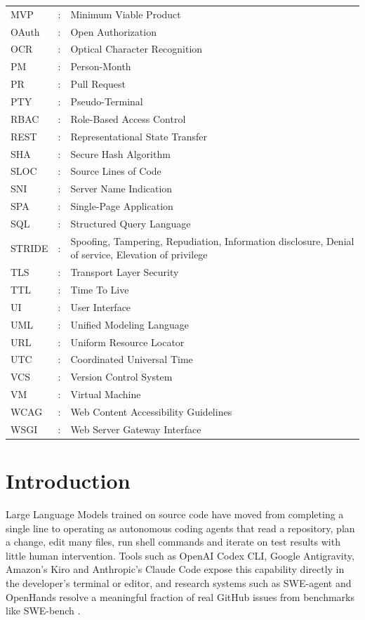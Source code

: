 \documentclass[12pt,a4paper,oneside]{report}
\begin{document}
\begin{longtable}{@{}p{1.1in}@{}p{0.25in}@{}p{4.9in}@{}}
MVP &: & Minimum Viable Product \\[2pt]
OAuth &: & Open Authorization \\[2pt]
OCR &: & Optical Character Recognition \\[2pt]
PM &: & Person-Month \\[2pt]
PR &: & Pull Request \\[2pt]
PTY &: & Pseudo-Terminal \\[2pt]
RBAC &: & Role-Based Access Control \\[2pt]
REST &: & Representational State Transfer \\[2pt]
SHA &: & Secure Hash Algorithm \\[2pt]
SLOC &: & Source Lines of Code \\[2pt]
SNI &: & Server Name Indication \\[2pt]
SPA &: & Single-Page Application \\[2pt]
SQL &: & Structured Query Language \\[2pt]
STRIDE &: & Spoofing, Tampering, Repudiation, Information disclosure, Denial of service, Elevation of privilege \\[2pt]
TLS &: & Transport Layer Security \\[2pt]
TTL &: & Time To Live \\[2pt]
UI &: & User Interface \\[2pt]
UML &: & Unified Modeling Language \\[2pt]
URL &: & Uniform Resource Locator \\[2pt]
UTC &: & Coordinated Universal Time \\[2pt]
VCS &: & Version Control System \\[2pt]
VM &: & Virtual Machine \\[2pt]
WCAG &: & Web Content Accessibility Guidelines \\[2pt]
WSGI &: & Web Server Gateway Interface \\[2pt]
\end{longtable}

\clearpage
{}
\setcounter{page}{1}

\chapter{Introduction}\label{introduction}

Large Language Models trained on source code have moved from completing a single line to operating as autonomous coding agents that read a repository, plan a change, edit many files, run shell commands and iterate on test results with little human intervention. Tools such as OpenAI Codex CLI, Google Antigravity, Amazon's Kiro and Anthropic's Claude Code expose this capability directly in the developer's terminal or editor, and research systems such as SWE-agent \cite{ref3} and OpenHands \cite{ref4} resolve a meaningful fraction of real GitHub issues from benchmarks like SWE-bench \cite{ref2}.
\end{document}
